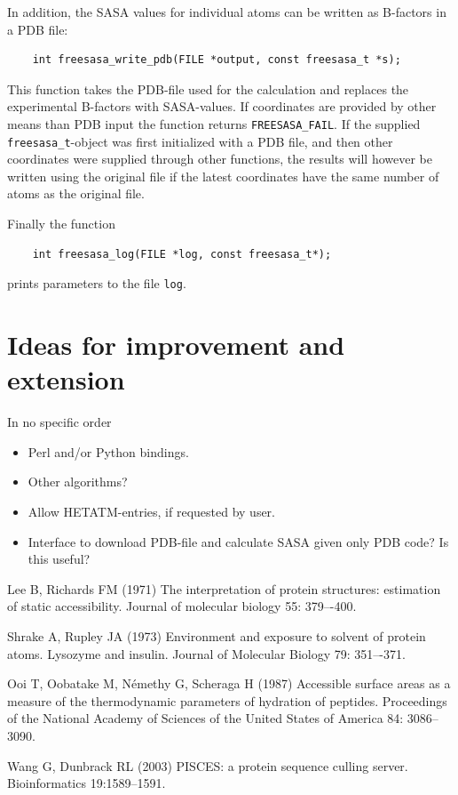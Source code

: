 \documentclass[a4paper,11pt]{article}
\begin{document}
In addition, the SASA values for individual atoms can be written as
B-factors in a PDB file:
\begin{verbatim}
    int freesasa_write_pdb(FILE *output, const freesasa_t *s);
\end{verbatim}
This function takes the PDB-file used for the calculation and replaces
the experimental B-factors with SASA-values. If coordinates are
provided by other means than PDB input the function returns
\verb|FREESASA_FAIL|. If the supplied \verb|freesasa_t|-object was first
initialized with a PDB file, and then other coordinates were supplied
through other functions, the results will however be written using the
original file if the latest coordinates have the same number of atoms
as the original file.

Finally the function
\begin{verbatim}
    int freesasa_log(FILE *log, const freesasa_t*);
\end{verbatim}
prints parameters to the file \verb|log|.

\section{Ideas for improvement and extension}

In no specific order
\begin{itemize}
\item Perl and/or Python bindings.
\item Other algorithms?
\item Allow HETATM-entries, if requested by user.
\item Interface to download PDB-file and calculate SASA given only PDB
  code? Is this useful?
\end{itemize}

\begin{thebibliography}{50}

  Lee B, Richards FM (1971) The interpretation of protein
  structures: estimation of static accessibility. Journal of molecular
  biology 55: 379–-400.

  Shrake A, Rupley JA (1973) Environment and exposure to
  solvent of protein atoms. Lysozyme and insulin. Journal of Molecular
  Biology 79: 351–-371.

  Ooi T, Oobatake M, Némethy G, Scheraga H (1987)
  Accessible surface areas as a measure of the thermodynamic
  parameters of hydration of peptides. Proceedings of the National
  Academy of Sciences of the United States of America 84: 3086–3090.

  Wang G, Dunbrack RL (2003) PISCES: a protein sequence culling server. 
  Bioinformatics 19:1589--1591.

\end{thebibliography}
\end{document}
